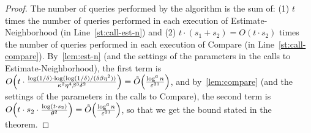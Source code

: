 \begin{proof}
The number of queries performed by the algorithm is the
sum of: (1) $t$ times the number of queries performed in each
execution of {\sc Estimate-Neighborhood} (in
Line~\ref{st:call-est-n}) and (2) $t\cdot(s_1+s_2)=O(t \cdot s_2)$
times the number of queries performed in each
execution of {\sc Compare} (in
Line~\ref{st:call-compare}). By~\cref{lem:est-n}
(and the settings of the parameters in the calls to
{\sc Estimate-Neighborhood}),
 the first term is
 $O\!\left(t\cdot \frac{\log(1/\delta)
        \cdot \log(\log(1/\delta)/(\delta\beta\eta^2))}
            {\kappa^2\eta^4\beta^3\delta^2}\right)
 = \tilde{O}\!\left(\frac{\log^6 n}{\varepsilon^{{21}}}\right)$,
 and by~\cref{lem:compare}
(and the settings of the parameters in the calls to
{\sc Compare}), the second term is
$O\!\left(t \cdot s_2\cdot \frac{\log(t\cdot s_2)}{\theta^2}\right)
= \tilde{O}\!\left(\frac{\log^6 n}{\varepsilon^{21}}\right)$,
so that we get the bound stated in the theorem.


\end{proof}
